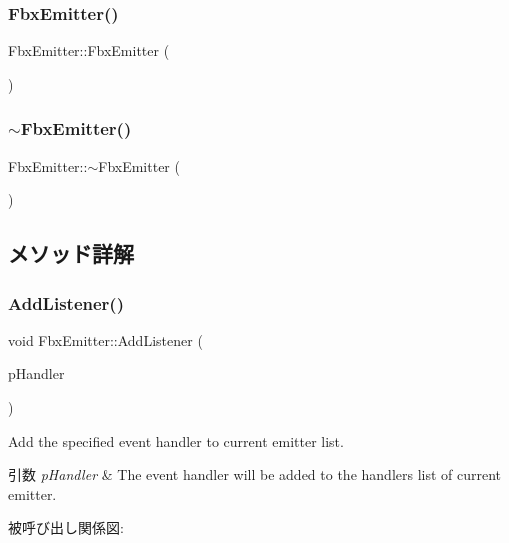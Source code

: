 \subsubsection{\texorpdfstring{Fbx\+Emitter()}{FbxEmitter()}}
{\footnotesize\ttfamily Fbx\+Emitter\+::\+Fbx\+Emitter (\begin{DoxyParamCaption}{ }\end{DoxyParamCaption})}

\mbox{\label{class_fbx_emitter_a58a10b2780c916dedd3ddbbf7ad62f3a}} 
\subsubsection{\texorpdfstring{$\sim$\+Fbx\+Emitter()}{~FbxEmitter()}}
{\footnotesize\ttfamily Fbx\+Emitter\+::$\sim$\+Fbx\+Emitter (\begin{DoxyParamCaption}{ }\end{DoxyParamCaption})}



\subsection{メソッド詳解}
\mbox{\label{class_fbx_emitter_ab8022a1fd620467f12f493673cfa16a9}} 
\subsubsection{\texorpdfstring{Add\+Listener()}{AddListener()}}
{\footnotesize\ttfamily void Fbx\+Emitter\+::\+Add\+Listener (\begin{DoxyParamCaption}\item[{\hyperlink{class_fbx_event_handler}{Fbx\+Event\+Handler} \&}]{p\+Handler }\end{DoxyParamCaption})}

Add the specified event handler to current emitter list. 
\begin{DoxyParams}{引数}
{\em p\+Handler} & The event handler will be added to the handlers list of current emitter. \\
\hline
\end{DoxyParams}
被呼び出し関係図\+:
\mbox{\label{class_fbx_emitter_ad541e3b06c0beeab71fcf066fc44c78d}} 
